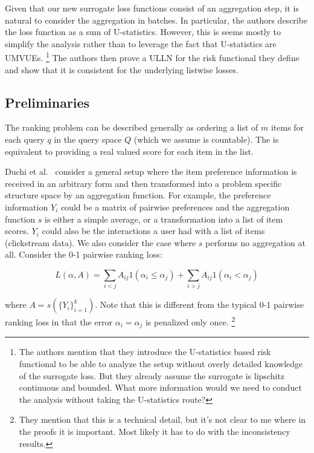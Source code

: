 \documentclass[a4paper,10pt]{article}
\begin{document}
Given that our new surrogate loss functions consist of an aggregation
step, it is natural to consider the aggregation in batches. In
particular, the authors describe the loss function as a sum of
U-statistics. However, this is seems mostly to simplify the analysis
rather than to leverage the fact that U-statistics are UMVUEs.
\footnote{The authors mention that they introduce the U-statistics
  based risk functional to be able to analyze the setup without overly
  detailed knowledge of the surrogate loss. But they already assume
  the surrogate is lipschitz continuous and bounded. What more
  information would we need to conduct the analysis without taking the
  U-statistics route?}
The authors then prove a ULLN for the risk
functional they define and show that it is consistent for the
underlying listwise losses.

\subsection{Preliminaries}

The ranking problem can be described generally as ordering a list of
\(m\) items for each query \(q\) in the query space \(Q\) (which we
assume is countable). The is equivalent to providing a real valued
score for each item in the list.

Duchi et al.~\cite{duchi-2013-ranking} consider a general setup where
the item preference information is received in an arbitrary form and
then transformed into a problem specific structure space by an
aggregation function. For example, the preference information $Y_i$
could be a matrix of pairwise preferences and the aggregation function
$s$ is either a simple average, or a transformation into a list of
item scores. $Y_i$ could also be the interactions a user had with a
list of items (clickstream data). We also consider the case where $s$ performs no
aggregation at all. Consider the 0-1 pairwise ranking loss:

\begin{equation} \label{eq:general-loss}
  L(\alpha, A) = \sum_{i<j} A_{ij}1(\alpha_i \leq \alpha_j) + \sum_{i>j} A_{ij}1(\alpha_i < \alpha_j)
\end{equation}

where $A = s(\{Y_i\}_{i=1}^k)$. Note that this is different from the typical 0-1 pairwise ranking loss in that the error \(\alpha_i = \alpha_j\) is penalized only once.
\footnote{They mention that this is a technical detail, but it's not clear to me where in the proofs it is important. Most likely it has to do with the inconsistency results.}
\end{document}
